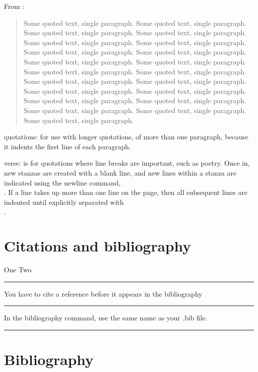 \documentclass[12pt]{article}
\newcommand{\inOut}[1]{#1}                                %
\begin{document}
    From \cite{Aa00}:

    \begin{quote}
        Some quoted text, single paragraph. Some quoted text, single paragraph. Some quoted text, single paragraph.
        Some quoted text, single paragraph. Some quoted text, single paragraph. Some quoted text, single paragraph.
        Some quoted text, single paragraph. Some quoted text, single paragraph. Some quoted text, single paragraph.
        Some quoted text, single paragraph. Some quoted text, single paragraph. Some quoted text, single paragraph.
        Some quoted text, single paragraph. Some quoted text, single paragraph. Some quoted text, single paragraph.
        Some quoted text, single paragraph. Some quoted text, single paragraph. Some quoted text, single paragraph.
        Some quoted text, single paragraph. Some quoted text, single paragraph. Some quoted text, single paragraph.
    \end{quote}

    quotations:
        for use with longer quotations, of more than one paragraph, because it indents the first line of each paragraph.

    verse:
        is for quotations where line breaks are important, such as poetry. Once in, new stanzas are created with a blank line, and new lines within a stanza are indicated using the newline command, \\. If a line takes up more than one line on the page, then all subsequent lines are indented until explicitly separated with \\.

\section{Citations and bibliography}\label{secCit}

    \begin{example} \label{expCite1}
    \inOut{One \cite{Aa01} Two \cite{LL01}}
    \end{example}\hrule

    \begin{remark} \label{remCite1}
        You have to cite a reference before it appears in the bibliography
    \end{remark}\hrule

    \begin{remark} \label{remCite2}
        In the bibliography command, use the same name as your .bib file.
    \end{remark}\hrule

    \section{Bibliography}\label{secBib}
    \newpage
    
\end{document}
